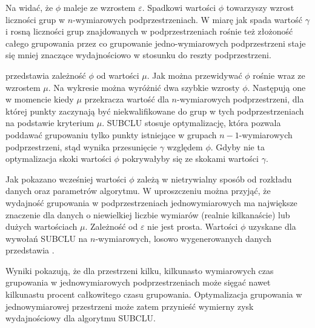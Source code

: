 

Na  widać, że $ \phi $ maleje ze wzrostem $ \varepsilon $. Spadkowi wartości $ \phi $ towarzyszy wzrost liczności grup w $ n $-wymiarowych podprzestrzeniach. W miarę jak spada wartość $ \gamma $ i rosną liczności grup znajdowanych w podprzestrzeniach rośnie też złożoność całego grupowania przez co grupowanie jedno-wymiarowych podprzestrzeni staje się mniej znaczące wydajnościowo w stosunku do reszty podprzestrzeni.\par

 przedstawia zależność $ \phi $ od wartości $ \mu $. Jak można przewidywać $ \phi $ rośnie wraz ze wzrostem $ \mu $. Na wykresie można wyróżnić dwa szybkie wzrosty $ \phi $. Następują one w momencie kiedy $ \mu $ przekracza wartość dla $ n $-wymiarowych podprzestrzeni, dla której punkty zaczynają być niekwalifikowane do grup w tych podprzestrzeniach na podstawie kryterium $ \mu $. SUBCLU stosuje optymalizację, która pozwala poddawać grupowaniu tylko punkty istniejące w grupach $ n-1 $-wymiarowych podprzestrzeni, stąd wynika przesunięcie $ \gamma $ względem $ \phi $. Gdyby nie ta optymalizacja skoki wartości $ \phi $ pokrywałyby się ze skokami wartości $ \gamma $.

Jak pokazano wcześniej wartości $ \phi $ zależą w nietrywialny sposób od rozkładu danych oraz parametrów algorytmu. W uproszczeniu można przyjąć, że wydajność grupowania w podprzestrzeniach jednowymiarowych ma największe znaczenie dla danych o niewielkiej liczbie wymiarów (realnie kilkanaście) lub dużych wartościach $ \mu $. Zależność od $ \varepsilon $ nie jest prosta. Wartości $ \phi $ uzyskane dla wywołań SUBCLU na $ n $-wymiarowych, losowo wygenerowanych danych przedstawia .



Wyniki pokazują, że dla przestrzeni kilku, kilkunasto wymiarowych czas grupowania w jednowymiarowych podprzestrzeniach może sięgać nawet kilkunastu procent całkowitego czasu grupowania. Optymalizacja grupowania w jednowymiarowej przestrzeni może zatem przynieść wymierny zysk wydajnościowy dla algorytmu SUBCLU. 

